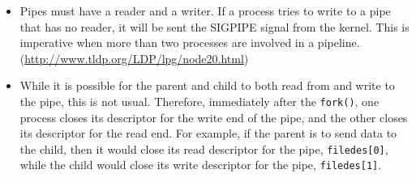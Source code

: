 \begin{itemize}
\item Pipes must have a reader and a writer. If a process tries to write to a pipe that
  has no reader, it will be sent the SIGPIPE signal from the kernel. This is imperative
  when more than two processes are involved in a
  pipeline. (\url{http://www.tldp.org/LDP/lpg/node20.html})
\item While it is possible for the parent and child to both read from and write to the
  pipe, this is not usual. Therefore, immediately after the \texttt{fork()}, one process
  closes its descriptor for the write end of the pipe, and the other closes its descriptor
  for the read end. For example, if the parent is to send data to the child, then it would
  close its read descriptor for the pipe, \texttt{filedes[0]}, while the child would close
  its write descriptor for the pipe, \texttt{filedes[1]}.
  

\end{itemize}
